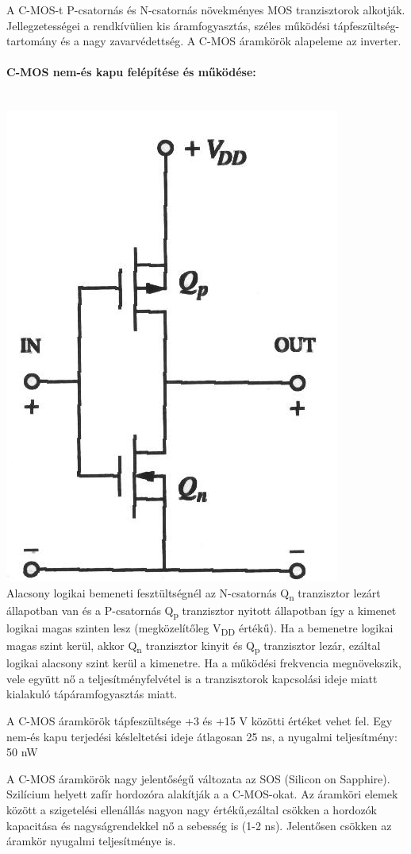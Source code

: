 A C-MOS-t P-csatornás és N-csatornás növekményes MOS tranzisztorok alkotják.
Jellegzetességei a rendkívülien kis áramfogyasztás, széles működési tápfeszültség-tartomány és a nagy zavarvédettség. A C-MOS áramkörök alapeleme az inverter.

\paragraph{C-MOS nem-és kapu felépítése és működése:}~\\
\includegraphics[width=0.5\linewidth]{fig/11-CMOS_NAND_schema}\\
Alacsony logikai bemeneti fesztültségnél az N-csatornás Q\textsubscript{n} tranzisztor lezárt állapotban van és a P-csatornás Q\textsubscript{p} tranzisztor nyitott állapotban így a kimenet logikai magas szinten lesz (megközelítőleg V\textsubscript{DD} értékű). Ha a bemenetre logikai magas szint kerül, akkor Q\textsubscript{n} tranzisztor kinyit és Q\textsubscript{p} tranzisztor lezár, ezáltal logikai alacsony szint kerül a kimenetre. Ha a működési frekvencia megnövekszik, vele együtt nő a teljesítményfelvétel is a tranzisztorok kapcsolási ideje miatt kialakuló tápáramfogyasztás miatt. 

A C-MOS áramkörök tápfeszültsége +3 és +15 V közötti értéket vehet fel. Egy nem-és kapu terjedési késleltetési ideje átlagosan 25 ns, a nyugalmi teljesítmény: 50 nW

A C-MOS áramkörök nagy jelentőségű változata az SOS (Silicon on Sapphire). Szilícium helyett zafír hordozóra alakítják a a C-MOS-okat. Az áramköri elemek között a szigetelési ellenállás nagyon nagy értékű,ezáltal csökken a hordozók kapacitása és nagyságrendekkel nő a sebesség is (1-2 ns). Jelentősen csökken az áramkör nyugalmi teljesítménye is.


